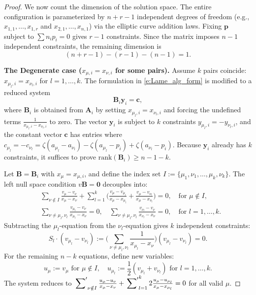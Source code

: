 \documentclass[11pt]{amsart}
\theoremstyle{remark}
\numberwithin{equation}{section}
\begin{document}
\begin{proof}
We now count the dimension of the solution space. The entire configuration is parameterized by $n+r-1$ independent degrees of freedom (e.g., $x_{1,1}, \dots, x_{1,r}$ and $x_{2,1}, \dots, x_{n,1}$) via the elliptic curve addition laws. Fixing $\mathbf{p}$ subject to $\sum n_i p_i = 0$ gives $r-1$ constraints. Since the matrix imposes $n-1$ independent constraints, the remaining dimension is 
\[
(n+r-1) - (r-1) - (n-1) = 1.
\]

\vspace{0.5em}
\textbf{The Degenerate case ($x_{\mu, i} = x_{\nu, i}$ for some pairs).}
Assume $k$ pairs coincide: $x_{\mu_l,i} = x_{\nu_l,i}$ for $l=1,\dots,k$. The formulation in \eqref{e:Lame_alg_form} is modified to a reduced system
\[
    \mathbf{B}_i \mathbf{y}_i = \mathbf{c},
\]
where $\mathbf{B}_i$ is obtained from $\mathbf{A}_i$ by setting $x_{\mu_l,i} = x_{\nu_l,i}$ and forcing the undefined terms $\frac{1}{x_{\mu_l,i} - x_{\nu_l,i}}$ to zero. The vector $\mathbf{y}_i$ is subject to $k$ constraints $y_{\mu_l,i} = -y_{\nu_l,i}$, and the constant vector $\mathbf{c}$ has entries where $c_{\mu_l} = -c_{\nu_l} = \zeta(a_{\mu_l}-a_{\nu_l}) - \zeta(a_{\mu_l} - p_i) + \zeta(a_{\nu_l} - p_i)$. Because $\mathbf{y}_i$ already has $k$ constraints, it suffices to prove $\mathrm{rank}(\mathbf{B}_i) \geq n-1-k$.

Let $\mathbf{B} = \mathbf{B}_i$ with $x_\mu = x_{\mu,i}$, and define the index set $I := \{\mu_1, \nu_1, \dots, \mu_k, \nu_k\}$. The left null space condition $v\mathbf{B} = \mathbf{0}$ decouples into:
\[
\begin{split}
    &\sum_{\nu \notin I} \frac{v_\mu-v_\nu}{x_\mu-x_\nu} + \sum_{l=1}^k \Big( \frac{v_\mu - v_{\mu_l}}{x_\mu - x_{\mu_l}} + \frac{v_\mu - v_{\nu_l}}{x_\mu - x_{\nu_l}} \Big) = 0, \quad \text{for } \mu \notin I, \\
    &\sum_{\nu \neq \mu_l, \nu_l} \frac{v_{\mu_l} - v_\nu}{x_{\mu_l} - x_\nu} = 0, \quad \sum_{\nu \neq \mu_l, \nu_l} \frac{v_{\nu_l} - v_\nu}{x_{\nu_l} - x_\nu} = 0, \quad \text{for } l=1,\dots,k.
\end{split}
\]
Subtracting the $\mu_l$-equation from the $\nu_l$-equation gives $k$ independent constraints:
\[
    S_l \cdot (v_{\mu_l} - v_{\nu_l}) := \Big( \sum_{\nu \neq \mu_l, \nu_l} \frac{1}{x_{\mu_l} - x_\nu} \Big) (v_{\mu_l} - v_{\nu_l}) = 0.
\]
For the remaining $n-k$ equations, define new variables:
\[
    u_\mu := v_\mu \text{ for } \mu \notin I, \quad u_{\mu_l} := \frac{1}{2}(v_{\mu_l} + v_{\nu_l}) \text{ for } l=1,\dots,k.
\]
The system reduces to $\sideset{}{'}\sum_{\nu \notin I} \frac{u_\mu - u_\nu}{x_\mu - x_\nu} + \sideset{}{'}\sum_{l=1}^k 2 \frac{u_\mu - u_{\mu_l}}{x_\mu - x_{\mu_l}} = 0$ for all valid $\mu$. 


\end{proof}
\end{document}
